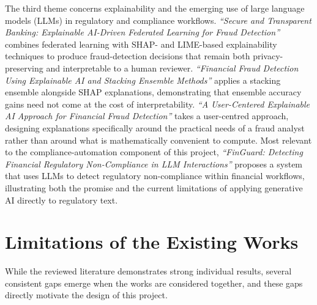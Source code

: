 The third theme concerns explainability and the emerging use of large language models (LLMs) in regulatory and compliance workflows. \textit{``Secure and Transparent Banking: Explainable AI-Driven Federated Learning for Fraud Detection''} \cite{xai_fed2025} combines federated learning with SHAP- and LIME-based explainability techniques to produce fraud-detection decisions that remain both privacy-preserving and interpretable to a human reviewer. \textit{``Financial Fraud Detection Using Explainable AI and Stacking Ensemble Methods''} \cite{xai_stack2025} applies a stacking ensemble alongside SHAP explanations, demonstrating that ensemble accuracy gains need not come at the cost of interpretability. \textit{``A User-Centered Explainable AI Approach for Financial Fraud Detection''} \cite{xai_user2024} takes a user-centred approach, designing explanations specifically around the practical needs of a fraud analyst rather than around what is mathematically convenient to compute. Most relevant to the compliance-automation component of this project, \textit{``FinGuard: Detecting Financial Regulatory Non-Compliance in LLM Interactions''} \cite{finguard2026} proposes a system that uses LLMs to detect regulatory non-compliance within financial workflows, illustrating both the promise and the current limitations of applying generative AI directly to regulatory text.

\section{Limitations of the Existing Works}

While the reviewed literature demonstrates strong individual results, several consistent gaps emerge when the works are considered together, and these gaps directly motivate the design of this project.

